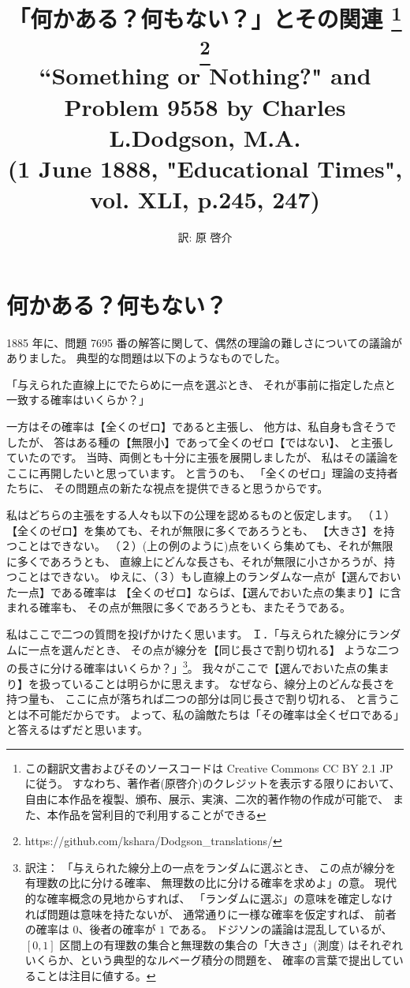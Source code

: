 \documentclass{article}
\title{「何かある？何もない？」とその関連
    \footnote{この翻訳文書およびそのソースコードは
    Creative Commons CC BY 2.1 JP に従う。
    すなわち、著作者(原啓介)のクレジットを表示する限りにおいて、
    自由に本作品を複製、頒布、展示、実演、二次的著作物の作成が可能で、
    また、本作品を営利目的で利用することができる}
    \footnote{https://github.com/kshara/Dodgson\_translations/}
    \\
    ``Something or Nothing?" and Problem 9558 by Charles L.Dodgson, M.A.
    \\
     (1 June 1888, "Educational Times", vol. XLI, p.245, 247)
}
\author{訳: 原 啓介}
\begin{document}
\maketitle

\section{何かある？何もない？}

  1885 年に、問題 7695 番の解答に関して、偶然の理論の難しさについての議論がありました。
典型的な問題は以下のようなものでした。

\bigskip

「与えられた直線上にでたらめに一点を選ぶとき、
それが事前に指定した点と一致する確率はいくらか？」

\bigskip

一方はその確率は【全くのゼロ】であると主張し、
他方は、私自身も含そうでしたが、
答はある種の【無限小】であって全くのゼロ【ではない】、
と主張していたのです。
当時、両側とも十分に主張を展開しましたが、
私はその議論をここに再開したいと思っています。
と言うのも、
「全くのゼロ」理論の支持者たちに、
その問題点の新たな視点を提供できると思うからです。

 私はどちらの主張をする人々も以下の公理を認めるものと仮定します。
（１）【全くのゼロ】を集めても、それが無限に多くであろうとも、
【大きさ】を持つことはできない。
（２）(上の例のように)点をいくら集めても、それが無限に多くであろうとも、
直線上にどんな長さも、それが無限に小さかろうが、持つことはできない。
ゆえに、（３）もし直線上のランダムな一点が【選んでおいた一点】である確率は
【全くのゼロ】ならば、【選んでおいた点の集まり】に含まれる確率も、
その点が無限に多くであろうとも、またそうである。

 私はここで二つの質問を投げかけたく思います。
Ｉ．「与えられた線分にランダムに一点を選んだとき、
その点が線分を【同じ長さで割り切れる】
ような二つの長さに分ける確率はいくらか？」\footnote{訳注：
「与えられた線分上の一点をランダムに選ぶとき、
この点が線分を有理数の比に分ける確率、
無理数の比に分ける確率を求めよ」の意。
現代的な確率概念の見地からすれば、
「ランダムに選ぶ」の意味を確定しなければ問題は意味を持たないが、
通常通りに一様な確率を仮定すれば、
前者の確率は $0$、後者の確率が $1$ である。
ドジソンの議論は混乱しているが、
$[0, 1]$ 区間上の有理数の集合と無理数の集合の「大きさ」(測度)
はそれぞれいくらか、という典型的なルベーグ積分の問題を、
確率の言葉で提出していることは注目に値する。}。
我々がここで【選んでおいた点の集まり】を扱っていることは明らかに思えます。
なぜなら、線分上のどんな長さを持つ量も、
ここに点が落ちれば二つの部分は同じ長さで割り切れる、
と言うことは不可能だからです。
よって、私の論敵たちは「その確率は全くゼロである」と答えるはずだと思います。
\end{document}
